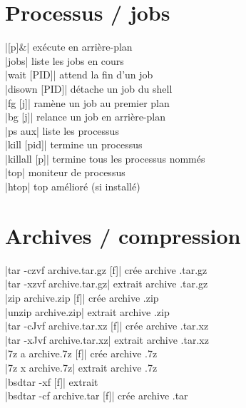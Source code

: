 \documentclass[9pt]{extarticle}
\newenvironment{cmdblock}{%
  \par\setlength{\parindent}{0pt}\setlength{\parskip}{0pt}%
  \RaggedRight%
}{\par}
\begin{document}
\begin{multicols}{4}
\section*{Processus / jobs}
\begin{cmdblock}
\code|[p]\&| \quad exécute en arrière-plan \\
\code|jobs| \quad liste les jobs en cours \\
\code|wait [PID]| \quad attend la fin d'un job \\
\code|disown [PID]| \quad détache un job du shell \\
\code|fg [j]| \quad ramène un job au premier plan \\
\code|bg [j]| \quad relance un job en arrière-plan \\
\code|ps aux| \quad liste les processus \\
\code|kill [pid]| \quad termine un processus \\
\code|killall [p]| \quad termine tous les processus nommés \\
\code|top| \quad moniteur de processus \\
\code|htop| \quad top amélioré (si installé) \\

\end{cmdblock}

\section*{Archives / compression}
\begin{cmdblock}
\code|tar -czvf archive.tar.gz [f]| \quad crée archive .tar.gz \\
\code|tar -xzvf archive.tar.gz| \quad extrait archive .tar.gz \\
\code|zip archive.zip [f]| \quad crée archive .zip \\
\code|unzip archive.zip| \quad extrait archive .zip \\
\code|tar -cJvf archive.tar.xz [f]| \quad crée archive .tar.xz \\
\code|tar -xJvf archive.tar.xz| \quad extrait archive .tar.xz \\
\code|7z a archive.7z [f]| \quad crée archive .7z \\
\code|7z x archive.7z| \quad extrait archive .7z \\
\code|bsdtar -xf [f]| \quad extrait \\
\code|bsdtar -cf archive.tar [f]| \quad crée archive .tar \\
\end{cmdblock}


\end{multicols}
\end{document}
